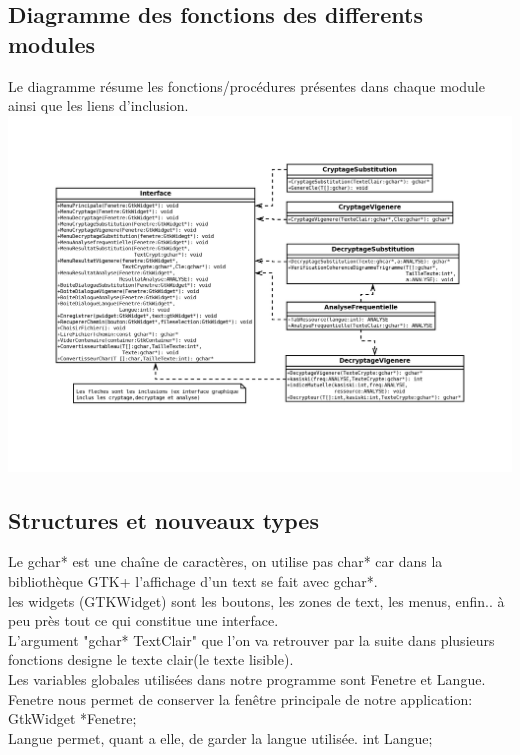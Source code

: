 \documentclass[a4]{article}
\begin{document}
		\subsection{Diagramme des fonctions des differents modules}
								Le diagramme résume les fonctions/procédures présentes dans chaque module ainsi que les liens d'inclusion.\\

		\includegraphics[scale=0.8]{diaa.jpg}
		\subsection{Structures et nouveaux types}
		Le gchar* est une chaîne de caractères, on utilise pas char* car dans la bibliothèque
		GTK+ l'affichage d'un text se fait avec gchar*.\\
		
		les widgets (GTKWidget) sont les boutons, les zones de text, les menus, enfin.. à peu 
		près tout ce qui constitue une interface.\\
		
		L'argument "gchar* TextClair" que l'on va retrouver par la suite dans plusieurs fonctions
		designe le texte clair(le texte lisible).\\
		
		Les variables globales utilisées dans notre programme sont Fenetre et Langue. Fenetre nous permet de
		conserver la fenêtre principale de notre application:\\
		GtkWidget *Fenetre; \\
		Langue permet, quant a elle, de garder la langue utilisée.
		int Langue;\\
		
\end{document}
